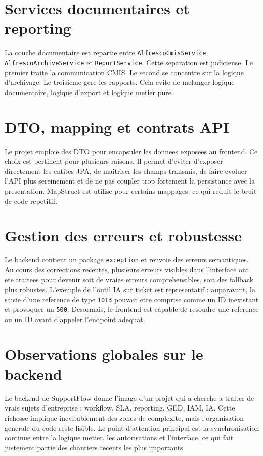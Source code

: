 \documentclass[12pt,a4paper,oneside]{report}
\begin{document}
\section{Services documentaires et reporting}

La couche documentaire est repartie entre \texttt{AlfrescoCmisService}, \texttt{AlfrescoArchiveService} et \texttt{ReportService}. Cette separation est judicieuse. Le premier traite la communication CMIS. Le second se concentre sur la logique d'archivage. Le troisieme gere les rapports. Cela evite de melanger logique documentaire, logique d'export et logique metier pure.

\section{DTO, mapping et contrats API}

Le projet emploie des DTO pour encapsuler les donnees exposees au frontend. Ce choix est pertinent pour plusieurs raisons. Il permet d'eviter d'exposer directement les entites JPA, de maitriser les champs transmis, de faire evoluer l'API plus sereinement et de ne pas coupler trop fortement la persistance avec la presentation. MapStruct est utilise pour certains mappages, ce qui reduit le bruit de code repetitif.

\section{Gestion des erreurs et robustesse}

Le backend contient un package \texttt{exception} et renvoie des erreurs semantiques. Au cours des corrections recentes, plusieurs erreurs visibles dans l'interface ont ete traitees pour devenir soit de vraies erreurs comprehensibles, soit des fallback plus robustes. L'exemple de l'outil IA sur ticket est representatif : auparavant, la saisie d'une reference de type \texttt{1013} pouvait etre comprise comme un ID inexistant et provoquer un \texttt{500}. Desormais, le frontend est capable de resoudre une reference ou un ID avant d'appeler l'endpoint adequat.

\section{Observations globales sur le backend}

Le backend de SupportFlow donne l'image d'un projet qui a cherche a traiter de vrais sujets d'entreprise : workflow, SLA, reporting, GED, IAM, IA. Cette richesse implique inevitablement des zones de complexite, mais l'organisation generale du code reste lisible. Le point d'attention principal est la synchronisation continue entre la logique metier, les autorisations et l'interface, ce qui fait justement partie des chantiers recents les plus importants.
\end{document}
